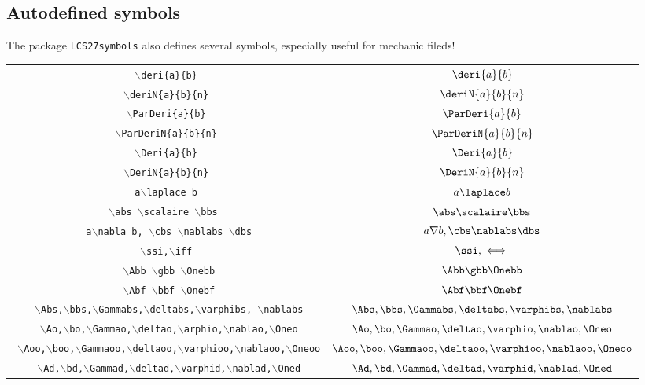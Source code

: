 \documentclass[a4paper,twoside,12pt]{article}
\begin{document}
\subsection{Autodefined symbols}
The package \texttt{LCS27symbols} also defines several symbols, especially useful for mechanic fileds!
\begin{table}[h]
\centering
\begin{tabular}{|c|c|}
\hline
\texttt{$\backslash$deri\{a\}\{b\}} &  $\deri{a}{b}$\\
\texttt{$\backslash$deriN\{a\}\{b\}\{n\}}& $\deriN{a}{b}{n}$\\
\texttt{$\backslash$ParDeri\{a\}\{b\}} & $     \ParDeri{a}{b}    $\\
\texttt{$\backslash$ParDeriN\{a\}\{b\}\{n\}} & $     \ParDeriN{a}{b}{n}    $\\
\texttt{$\backslash$Deri\{a\}\{b\}}& $     \Deri{a}{b}   $\\
\texttt{$\backslash$DeriN\{a\}\{b\}\{n\}}& $     \DeriN{a}{b}{n}   $\\
\texttt{    a$\backslash$laplace b   }& $     a\laplace b   $\\
\texttt{$\backslash$abs $\backslash$scalaire $\backslash$bbs   }& $     \abs \scalaire \bbs   $\\
\texttt{    a$\backslash$nabla b, $\backslash$cbs $\backslash$nablabs $\backslash$dbs} & $      a \nabla b, \cbs \nablabs \dbs   $\\
\texttt{    $\backslash$ssi,$\backslash$iff } & $     \ssi,\iff $\\
\texttt{   $\backslash$Abb $\backslash$gbb $\backslash$Onebb}& $   \Abb \gbb \Onebb$\\
\texttt{    $\backslash$Abf $\backslash$bbf $\backslash$Onebf} & $   \Abf \bbf \Onebf$\\
\texttt{    $\backslash$Abs,$\backslash$bbs,$\backslash$Gammabs,$\backslash$deltabs,$\backslash$varphibs, $\backslash$nablabs}& $     \Abs,\bbs,\Gammabs,\deltabs,\varphibs, \nablabs   $\\
\texttt{   $\backslash$Ao,$\backslash$bo,$\backslash$Gammao,$\backslash$deltao,$\backslash$arphio,$\backslash$nablao,$\backslash$Oneo}& $     \Ao,\bo,\Gammao,\deltao,\varphio,\nablao,\Oneo    $\\
\texttt{   $\backslash$Aoo,$\backslash$boo,$\backslash$Gammaoo,$\backslash$deltaoo,$\backslash$varphioo,$\backslash$nablaoo,$\backslash$Oneoo}& $     \Aoo,\boo,\Gammaoo,\deltaoo,\varphioo,\nablaoo    ,\Oneoo$\\
\texttt{   $\backslash$Ad,$\backslash$bd,$\backslash$Gammad,$\backslash$deltad,$\backslash$varphid,$\backslash$nablad,$\backslash$Oned} & $     \Ad,\bd,\Gammad,\deltad,\varphid,\nablad,\Oned    $\\

\end{tabular}
\end{table}
\end{document}
